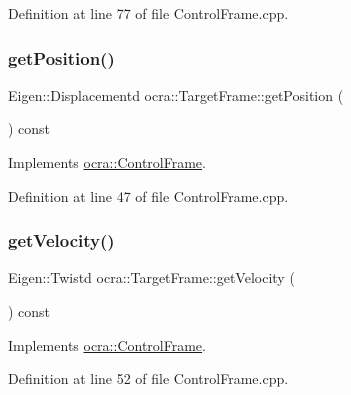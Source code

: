 Definition at line 77 of file Control\+Frame.\+cpp.

\hypertarget{classocra_1_1TargetFrame_ab2f3bd3f05be243a5d9e2123b943986d}{}\label{classocra_1_1TargetFrame_ab2f3bd3f05be243a5d9e2123b943986d} 
\subsubsection{\texorpdfstring{get\+Position()}{getPosition()}}
{\footnotesize\ttfamily Eigen\+::\+Displacementd ocra\+::\+Target\+Frame\+::get\+Position (\begin{DoxyParamCaption}{ }\end{DoxyParamCaption}) const\hspace{0.3cm}{\ttfamily [virtual]}}



Implements \hyperlink{classocra_1_1ControlFrame_aaadbbfbcdd5b8e197a0f181ffb2fdcbe}{ocra\+::\+Control\+Frame}.



Definition at line 47 of file Control\+Frame.\+cpp.

\hypertarget{classocra_1_1TargetFrame_a5eeda88210d7002c3c73ba949139ed5b}{}\label{classocra_1_1TargetFrame_a5eeda88210d7002c3c73ba949139ed5b} 
\subsubsection{\texorpdfstring{get\+Velocity()}{getVelocity()}}
{\footnotesize\ttfamily Eigen\+::\+Twistd ocra\+::\+Target\+Frame\+::get\+Velocity (\begin{DoxyParamCaption}{ }\end{DoxyParamCaption}) const\hspace{0.3cm}{\ttfamily [virtual]}}



Implements \hyperlink{classocra_1_1ControlFrame_a398df839f75886867c86a8e70ac9bf24}{ocra\+::\+Control\+Frame}.



Definition at line 52 of file Control\+Frame.\+cpp.

\hypertarget{classocra_1_1TargetFrame_a5e9ccc5e2e5ae8e52a37b5810a76115d}{}\label{classocra_1_1TargetFrame_a5e9ccc5e2e5ae8e52a37b5810a76115d} 
